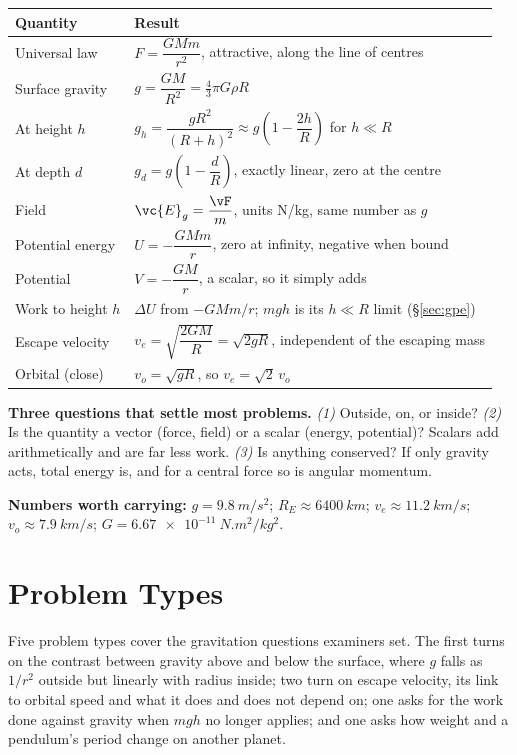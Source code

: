 \medskip
{\small\renewcommand{\arraystretch}{1.45}
\begin{center}
\begin{tabular}{@{}ll@{}}
\toprule
Quantity & Result\\
\midrule
Universal law        & $F=\dfrac{GMm}{r^{2}}$, attractive, along the line of centres\\[4pt]
Surface gravity      & $g=\dfrac{GM}{R^{2}}=\tfrac{4}{3}\pi G\rho R$\\[4pt]
At height $h$        & $g_h=\dfrac{gR^{2}}{(R+h)^{2}}\approx g\!\left(1-\dfrac{2h}{R}\right)$ for $h\ll R$\\[4pt]
At depth $d$         & $g_d=g\!\left(1-\dfrac{d}{R}\right)$, exactly linear, zero at the centre\\[4pt]
Field                & $\vc{E}_g=\dfrac{\vF}{m}$, units \si{N/kg}, same number as $g$\\[4pt]
Potential energy     & $U=-\dfrac{GMm}{r}$, zero at infinity, negative when bound\\[4pt]
Potential            & $V=-\dfrac{GM}{r}$, a scalar, so it simply adds\\[4pt]
Work to height $h$   & $\Delta U$ from $-GMm/r$; $mgh$ is its $h\ll R$ limit (\S\ref{sec:gpe})\\[4pt]
Escape velocity      & $v_e=\sqrt{\dfrac{2GM}{R}}=\sqrt{2gR}$, independent of the escaping mass\\[4pt]
Orbital (close)      & $v_o=\sqrt{gR}$, so $v_e=\sqrt2\,v_o$\\
\bottomrule
\end{tabular}
\end{center}
}

\medskip
\textbf{Three questions that settle most problems.}
\emph{(1)} Outside, on, or inside? \emph{(2)} Is the quantity a vector (force, field) or a scalar
(energy, potential)? Scalars add arithmetically and are far less work.
\emph{(3)} Is anything conserved? If only gravity acts, total energy is, and for a central force so is
angular momentum.

\medskip
\textbf{Numbers worth carrying:} $g=\SI{9.8}{m/s^2}$; $R_E\approx\SI{6400}{km}$;
$v_e\approx\SI{11.2}{km/s}$; $v_o\approx\SI{7.9}{km/s}$; $G=\SI{6.67e-11}{N.m^2/kg^2}$.

\section{Problem Types}\label{sec:types16}
Five problem types cover the gravitation questions examiners set. The first turns on the contrast between
gravity above and below the surface, where $g$ falls as $1/r^2$ outside but linearly with radius inside;
two turn on escape velocity, its link to orbital speed and what it does and does not depend on; one asks
for the work done against gravity when $mgh$ no longer applies; and one asks how weight and a pendulum's
period change on another planet.

